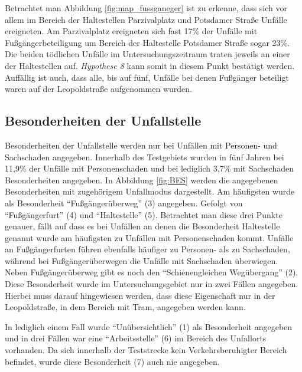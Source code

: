 Betrachtet man Abbildung \ref{fig:map_fussganeger} ist zu erkenne, dass sich vor allem im Bereich der Haltestellen Parzivalplatz und Potsdamer Straße Unfälle ereigneten. Am Parzivalplatz ereigneten sich fast 17\% der Unfälle mit Fußgängerbeteiligung um Bereich der Haltestelle Potsdamer Straße sogar 23\%. Die beiden tödlichen Unfälle im Untersuchungszeitraum traten jeweils an einer der Haltestellen auf. \textit{Hypothese 8} kann somit in diesem Punkt bestätigt werden. Auffällig ist auch, dass alle, bis auf fünf, Unfälle bei denen Fußgänger beteiligt waren auf der Leopoldstraße aufgenommen wurden.

\subsection{Besonderheiten der Unfallstelle}
Besonderheiten der Unfallstelle werden nur bei Unfällen mit Personen- und Sachschaden angegeben. Innerhalb des Testgebiets wurden in fünf Jahren bei 11,9\% der Unfälle mit Personenschaden und bei lediglich 3,7\% mit Sachschaden Besonderheiten angegeben. In Abbildung \ref{fig:BES} werden die angegebenen Besonderheiten mit zugehörigem Unfallmodus dargestellt. Am häufigsten wurde als Besonderheit \enquote{Fußgängerüberweg} (3) angegeben. Gefolgt von \enquote{Fußgängerfurt} (4) und \enquote{Haltestelle} (5). Betrachtet man diese drei Punkte genauer, fällt auf dass es bei Unfällen an denen die Besonderheit Haltestelle genannt wurde am häufigsten zu Unfällen mit Personenschaden kommt. Unfälle an Fußgängerfurten führen ebenfalls häufiger zu Personen- als zu Sachschaden, während bei Fußgängerüberwegen die Unfälle mit Sachschaden überwiegen. Neben Fußgängerüberweg gibt es noch den \enquote{Schienengleichen Wegübergang} (2). Diese Besonderheit wurde im Untersuchungsgebiet nur in zwei Fällen angegeben. Hierbei muss darauf hingewiesen werden, dass diese Eigenschaft nur in der Leopoldstraße, in dem Bereich mit Tram, angegeben werden kann.

In lediglich einem Fall wurde \enquote{Unübersichtlich} (1) als Besonderheit angegeben und in drei Fällen war eine \enquote{Arbeitsstelle} (6) im Bereich des Unfallorts vorhanden. Da sich innerhalb der Teststrecke kein Verkehrsberuhigter Bereich befindet, wurde diese Besonderheit (7) auch nie angegeben. 

